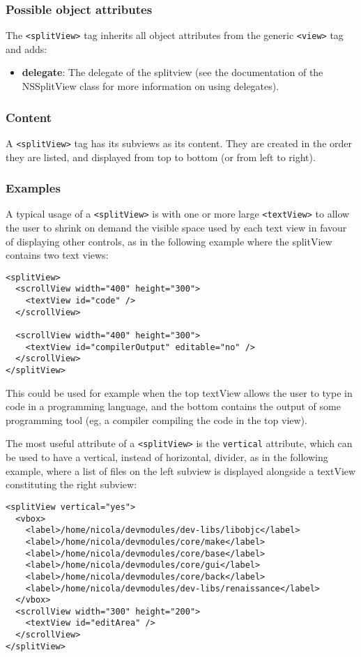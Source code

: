 \subsubsection{Possible object attributes}
The \texttt{<splitView>} tag inherits all object attributes from the
generic \texttt{<view>} tag and adds:
\begin{itemize}
\item {\bf delegate}: The delegate of the splitview (see the
  documentation of the NSSplitView class for more information on using
  delegates).
\end{itemize}

\subsubsection{Content}
A \texttt{<splitView>} tag has its subviews as its content.  They are
created in the order they are listed, and displayed from top to bottom
(or from left to right).

\subsubsection{Examples}
A typical usage of a \texttt{<splitView>} is with one or more large
\texttt{<textView>} to allow the user to shrink on demand the visible
space used by each text view in favour of displaying other controls,
as in the following example where the splitView contains two text
views:
\begin{verbatim}
<splitView>
  <scrollView width="400" height="300">
    <textView id="code" />
  </scrollView>

  <scrollView width="400" height="300">
    <textView id="compilerOutput" editable="no" />
  </scrollView>
</splitView>
\end{verbatim}
This could be used for example when the top textView allows the user
to type in code in a programming language, and the bottom contains the
output of some programming tool (eg, a compiler compiling the code in
the top view).

The most useful attribute of a \texttt{<splitView>} is the
\texttt{vertical} attribute, which can be used to have a vertical,
instead of horizontal, divider, as in the following example, where a
list of files on the left subview is displayed alongside a textView
constituting the right subview:
\begin{verbatim}
<splitView vertical="yes">
  <vbox>
    <label>/home/nicola/devmodules/dev-libs/libobjc</label>
    <label>/home/nicola/devmodules/core/make</label>
    <label>/home/nicola/devmodules/core/base</label>
    <label>/home/nicola/devmodules/core/gui</label>
    <label>/home/nicola/devmodules/core/back</label>
    <label>/home/nicola/devmodules/dev-libs/renaissance</label>
  </vbox>
  <scrollView width="300" height="200">
    <textView id="editArea" />
  </scrollView>
</splitView>
\end{verbatim}

